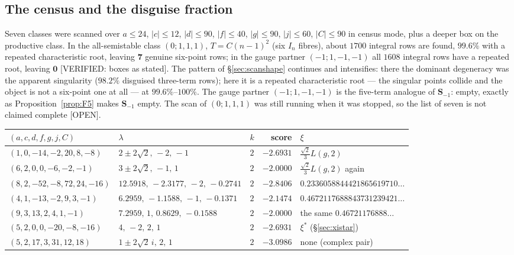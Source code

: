 \documentclass[11pt,reqno]{amsart}
\theoremstyle{plain}
\theoremstyle{definition}
\theoremstyle{remark}
\theoremstyle{plain}
\newcommand{\Verified}[1]{\textup{\textsf{[VERIFIED: #1]}}}
\newcommand{\Open}{\textup{\textsf{[OPEN]}}}
\begin{document}
\subsection{The census and the disguise fraction}
Seven classes were scanned over $a\le24$, $|c|\le12$, $|d|\le90$, $|f|\le40$,
$|g|\le90$, $|j|\le60$, $|C|\le90$ in census mode, plus a deeper box on the
productive class. In the all-semistable class $(0;1,1,1)$, $T=C(n-1)^2$ (six
$I_n$ fibres), about $1700$ integral rows are found, $99.6\%$ with a repeated
characteristic root, leaving $\mathbf 7$ genuine six-point rows; in the gauge
partner $(-1;1,-1,-1)$ all $1608$ integral rows have a repeated root, leaving
$\mathbf 0$ \Verified{boxes as stated}. The pattern of \S\ref{sec:scanshape}
continues and intensifies: there the dominant degeneracy was the apparent
singularity ($98.2\%$ disguised three-term rows); here it is a repeated
characteristic root --- the singular points collide and the object is not a
six-point one at all --- at $99.6\%$--$100\%$. The gauge partner
$(-1;1,-1,-1)$ is the five-term analogue of $\mathbf S_{-1}$: empty, exactly as
Proposition~\ref{prop:F5} makes $\mathbf S_{-1}$ empty. The scan of $(0;1,1,1)$
was still running when it was stopped, so the list of seven is not claimed
complete \Open.

\begin{center}\footnotesize
\begin{tabular}{lllrl}
\toprule
$(a,c,d,f,g,j,C)$ & $\lambda$ & $k$ & score & $\xi$\\
\midrule
$(1,0,-14,-2,20,8,-8)$ & $2{\pm}2\sqrt2,\,-2,\,-1$ & $2$ & $-2.6931$ & $\tfrac{\sqrt2}3L(g,2)$\\
$(6,2,0,0,-6,-2,-1)$ & $3{\pm}2\sqrt2,\,-1,\,1$ & $2$ & $\mathbf{-2.0000}$ & $\tfrac{\sqrt2}3L(g,2)$ again\\
$(8,2,-52,-8,72,24,-16)$ & $12.5918,\,-2.3177,\,-2,\,-0.2741$ & $2$ & $-2.8406$ & $0.2336058844421865619710\dots$\\
$(4,1,-13,-2,9,3,-1)$ & $6.2959,\,-1.1588,\,-1,\,-0.1371$ & $2$ & $-2.1474$ & $0.4672117688843731239421\dots$\\
$(9,3,13,2,4,1,-1)$ & $7.2959,\,1,\,0.8629,\,-0.1588$ & $2$ & $\mathbf{-2.0000}$ & the same $0.46721176888\dots$\\
$(5,2,0,0,-20,-8,-16)$ & $4,\,-2,\,2,\,1$ & $2$ & $-2.6931$ & $\xi^*$ (\S\ref{sec:xistar})\\
$(5,2,17,3,31,12,18)$ & $1{\pm}2\sqrt2\,i,\,2,\,1$ & $2$ & $-3.0986$ & none (complex pair)\\
\bottomrule
\end{tabular}
\end{center}
\end{document}
